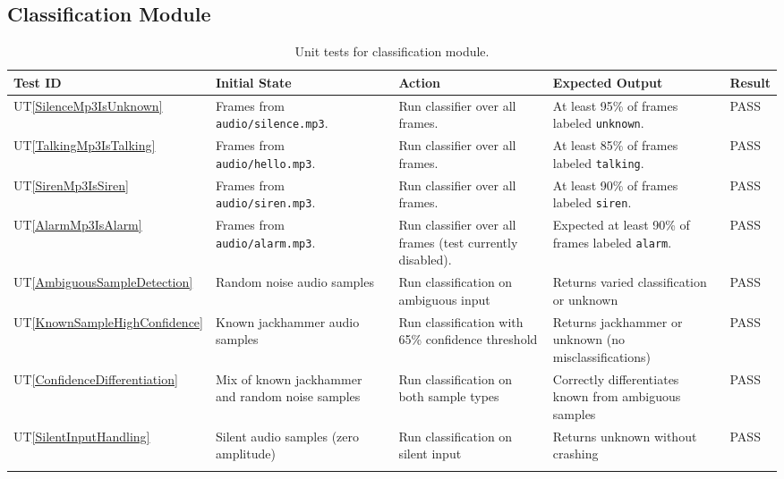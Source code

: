 \documentclass[12pt, titlepage]{article}
\newcommand{\utref}[1]{UT\ref{#1}}
\begin{document}
\subsection{Classification Module}
{\footnotesize
\begin{longtable}{|p{0.8cm}|p{3.5cm}|p{3.5cm}|p{3.5cm}|p{1cm}|}
    \hline
    \textbf{Test ID} & \textbf{Initial State} & \textbf{Action} &
    \textbf{Expected Output} & \textbf{Result} \\ 
    \endfirsthead
    \hline
    
    \utref{SilenceMp3IsUnknown} & Frames from \texttt{audio/silence.mp3}. &
    Run classifier over all frames. & At least 95\% of frames labeled
    \texttt{unknown}. & PASS\\
    \hline
    \utref{TalkingMp3IsTalking} & Frames from \texttt{audio/hello.mp3}.
    & Run classifier over all frames. & At least 85\% of frames labeled
    \texttt{talking}. & PASS\\
    \hline
    \utref{SirenMp3IsSiren} & Frames from \texttt{audio/siren.mp3}. & Run
    classifier over all frames. & At least 90\% of frames labeled
    \texttt{siren}. & PASS\\
    \hline
    \utref{AlarmMp3IsAlarm} & Frames from \texttt{audio/alarm.mp3}. &
    Run classifier over all frames (test currently disabled). & Expected at
    least 90\% of frames labeled \texttt{alarm}. & PASS\\
    \hline
    \utref{AmbiguousSampleDetection} & Random noise audio samples & Run
    classification on ambiguous input & Returns varied classification or unknown
    & PASS\\
    \hline
    \utref{KnownSampleHighConfidence} & Known jackhammer audio samples & Run
    classification with 65\% confidence threshold & Returns jackhammer or
    unknown (no misclassifications) & PASS\\
    \hline
    \utref{ConfidenceDifferentiation} & Mix of known jackhammer and random noise
    samples & Run classification on both sample types & Correctly differentiates
    known from ambiguous samples & PASS\\
    \hline
    \utref{SilentInputHandling} & Silent audio samples (zero amplitude) & Run
    classification on silent input & Returns unknown without crashing & PASS\\
    \hline

    \caption{Unit tests for classification module.}
    \label{tab:unit_test_classification}
\end{longtable}
}
\end{document}
